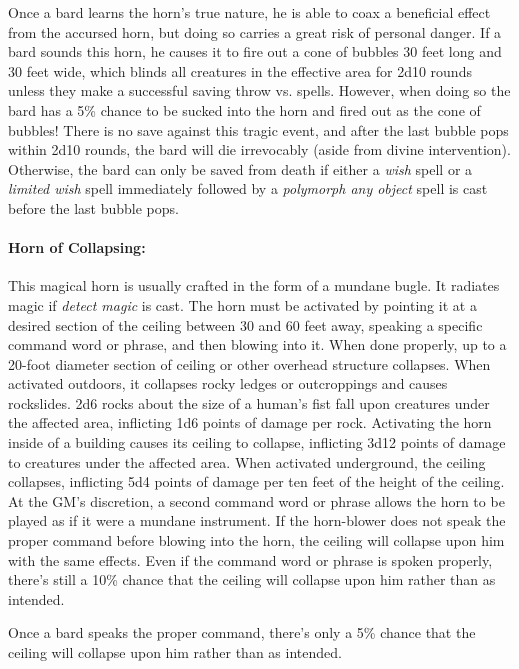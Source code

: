 \begin{multicols}{2}
Once a bard learns the horn's true nature, he is able to coax a beneficial effect from the accursed horn, but doing so carries a great risk of personal danger.  If a bard sounds this horn, he causes it to fire out a cone of bubbles 30 feet long and 30 feet wide, which blinds all creatures in the effective area for 2d10 rounds unless they make a successful saving throw vs. spells.  However, when doing so the bard has a 5\% chance to be sucked into the horn and fired out as the cone of bubbles!  There is no save against this tragic event, and after the last bubble pops within 2d10 rounds, the bard will die irrevocably (aside from divine intervention).  Otherwise, the bard can only be saved from death if either a \textit{wish} spell or a \textit{limited wish} spell immediately followed by a \textit{polymorph any object} spell is cast before the last bubble pops.

\paragraph{Horn of Collapsing:} This magical horn is usually crafted in the form of a mundane bugle.  It radiates magic if \textit{detect magic} is cast.  The horn must be activated by pointing it at a desired section of the ceiling between 30 and 60 feet away, speaking a specific command word or phrase, and then blowing into it.  When done properly, up to a 20-foot diameter section of ceiling or other overhead structure collapses.  When activated outdoors, it collapses rocky ledges or outcroppings and causes rockslides.  2d6 rocks about the size of a human's fist fall upon creatures under the affected area, inflicting 1d6 points of damage per rock.  Activating the horn inside of a building causes its ceiling to collapse, inflicting 3d12 points of damage to creatures under the affected area.  When activated underground, the ceiling collapses, inflicting 5d4 points of damage per ten feet of the height of the ceiling.  At the GM's discretion, a second command word or phrase allows the horn to be played as if it were a mundane instrument.  If the horn-blower does not speak the proper command before blowing into the horn, the ceiling will collapse upon him with the same effects.  Even if the command word or phrase is spoken properly, there's still a 10\% chance that the ceiling will collapse upon him rather than as intended.

Once a bard speaks the proper command, there's only a 5\% chance that the ceiling will collapse upon him rather than as intended.


\end{multicols}
